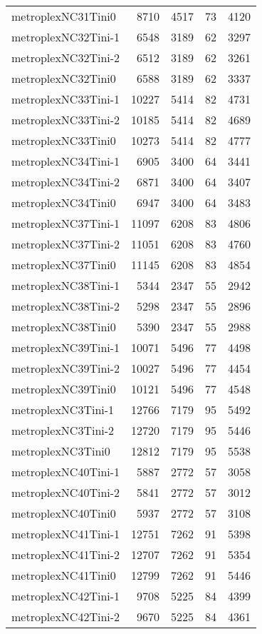 \begin{longtable}{lrrrr}
metroplexNC31Tini0 & 8710 & 4517 & 73 & 4120 \\
metroplexNC32Tini-1 & 6548 & 3189 & 62 & 3297 \\
metroplexNC32Tini-2 & 6512 & 3189 & 62 & 3261 \\
metroplexNC32Tini0 & 6588 & 3189 & 62 & 3337 \\
metroplexNC33Tini-1 & 10227 & 5414 & 82 & 4731 \\
metroplexNC33Tini-2 & 10185 & 5414 & 82 & 4689 \\
metroplexNC33Tini0 & 10273 & 5414 & 82 & 4777 \\
metroplexNC34Tini-1 & 6905 & 3400 & 64 & 3441 \\
metroplexNC34Tini-2 & 6871 & 3400 & 64 & 3407 \\
metroplexNC34Tini0 & 6947 & 3400 & 64 & 3483 \\
metroplexNC37Tini-1 & 11097 & 6208 & 83 & 4806 \\
metroplexNC37Tini-2 & 11051 & 6208 & 83 & 4760 \\
metroplexNC37Tini0 & 11145 & 6208 & 83 & 4854 \\
metroplexNC38Tini-1 & 5344 & 2347 & 55 & 2942 \\
metroplexNC38Tini-2 & 5298 & 2347 & 55 & 2896 \\
metroplexNC38Tini0 & 5390 & 2347 & 55 & 2988 \\
metroplexNC39Tini-1 & 10071 & 5496 & 77 & 4498 \\
metroplexNC39Tini-2 & 10027 & 5496 & 77 & 4454 \\
metroplexNC39Tini0 & 10121 & 5496 & 77 & 4548 \\
metroplexNC3Tini-1 & 12766 & 7179 & 95 & 5492 \\
metroplexNC3Tini-2 & 12720 & 7179 & 95 & 5446 \\
metroplexNC3Tini0 & 12812 & 7179 & 95 & 5538 \\
metroplexNC40Tini-1 & 5887 & 2772 & 57 & 3058 \\
metroplexNC40Tini-2 & 5841 & 2772 & 57 & 3012 \\
metroplexNC40Tini0 & 5937 & 2772 & 57 & 3108 \\
metroplexNC41Tini-1 & 12751 & 7262 & 91 & 5398 \\
metroplexNC41Tini-2 & 12707 & 7262 & 91 & 5354 \\
metroplexNC41Tini0 & 12799 & 7262 & 91 & 5446 \\
metroplexNC42Tini-1 & 9708 & 5225 & 84 & 4399 \\
metroplexNC42Tini-2 & 9670 & 5225 & 84 & 4361 \\

\end{longtable}

